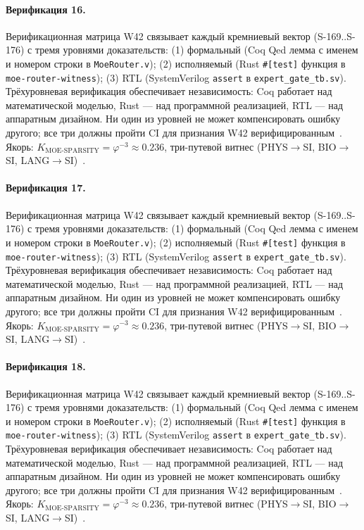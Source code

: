 \paragraph{Верификация 16.} Верификационная матрица W42 связывает каждый кремниевый вектор (S-169..S-176) с тремя уровнями доказательств: (1) формальный (Coq Qed лемма с именем и номером строки в \texttt{MoeRouter.v}); (2) исполняемый (Rust \texttt{\#[test]} функция в \texttt{moe-router-witness}); (3) RTL (SystemVerilog \texttt{assert} в \texttt{expert\_gate\_tb.sv}). Трёхуровневая верификация обеспечивает независимость: Coq работает над математической моделью, Rust --- над программной реализацией, RTL --- над аппаратным дизайном. Ни один из уровней не может компенсировать ошибку другого; все три должны пройти CI для признания W42 верифицированным~\cite{lee_gvsu_proof2021}. Якорь: $K_{\text{MOE-SPARSITY}} = \varphi^{-3} \approx 0{.}236$, три-путевой витнес (PHYS$\to$SI, BIO$\to$SI, LANG$\to$SI)~\cite{zenodo_trinity_2026}.

\paragraph{Верификация 17.} Верификационная матрица W42 связывает каждый кремниевый вектор (S-169..S-176) с тремя уровнями доказательств: (1) формальный (Coq Qed лемма с именем и номером строки в \texttt{MoeRouter.v}); (2) исполняемый (Rust \texttt{\#[test]} функция в \texttt{moe-router-witness}); (3) RTL (SystemVerilog \texttt{assert} в \texttt{expert\_gate\_tb.sv}). Трёхуровневая верификация обеспечивает независимость: Coq работает над математической моделью, Rust --- над программной реализацией, RTL --- над аппаратным дизайном. Ни один из уровней не может компенсировать ошибку другого; все три должны пройти CI для признания W42 верифицированным~\cite{lee_gvsu_proof2021}. Якорь: $K_{\text{MOE-SPARSITY}} = \varphi^{-3} \approx 0{.}236$, три-путевой витнес (PHYS$\to$SI, BIO$\to$SI, LANG$\to$SI)~\cite{zenodo_trinity_2026}.

\paragraph{Верификация 18.} Верификационная матрица W42 связывает каждый кремниевый вектор (S-169..S-176) с тремя уровнями доказательств: (1) формальный (Coq Qed лемма с именем и номером строки в \texttt{MoeRouter.v}); (2) исполняемый (Rust \texttt{\#[test]} функция в \texttt{moe-router-witness}); (3) RTL (SystemVerilog \texttt{assert} в \texttt{expert\_gate\_tb.sv}). Трёхуровневая верификация обеспечивает независимость: Coq работает над математической моделью, Rust --- над программной реализацией, RTL --- над аппаратным дизайном. Ни один из уровней не может компенсировать ошибку другого; все три должны пройти CI для признания W42 верифицированным~\cite{lee_gvsu_proof2021}. Якорь: $K_{\text{MOE-SPARSITY}} = \varphi^{-3} \approx 0{.}236$, три-путевой витнес (PHYS$\to$SI, BIO$\to$SI, LANG$\to$SI)~\cite{zenodo_trinity_2026}.

